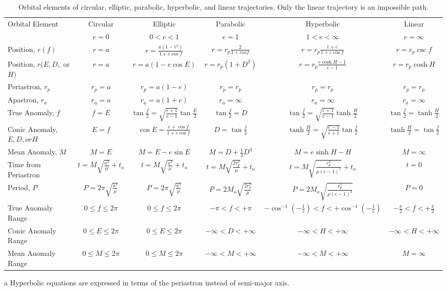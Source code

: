 \documentclass[a4paper,fleqn,usenatbib]{mnras}
\begin{document}
\begin{table}
\begin{threeparttable}
\centering
\caption{Orbital elements of circular, elliptic, parabolic, hyperbolic, and linear trajectories. Only the linear trajectory is an impossible path.}
\begin{tabular}{ l c c c c c }
 \hline
 \hline
Orbital Element & Circular & Elliptic & Parabolic &
 	Hyperbolic\tnote{a} & Linear \\
& $e=0$ & $0<e<1$ & $e=1$ & $1<e<\infty$ & $e=\infty$ \\
 \hline
 Position, $r(f)$ & $r=a$ & $r=\frac{a(1-e^2)}{1+e\cos{f}}$ & $r=r_p\frac{2}{1+cos{f}}$ & $r=r_p\frac{1+e}{1+e\cos{f}}$  & $r=r_p\csc{f}$ \\
 Position, $r(E, D,$ or $H)$ & $r=a$ & $r=a(1-e\cos{E})$ & $r=r_p(1+D^2)$ & $r=r_p\frac{e\cosh{H}-1}{e-1}$  & $r=r_p\cosh{H}$ \\
 Periastron, $r_p$ & $r_p=a$ & $r_p=a(1-e)$ & $r_p=r_p$ & $r_p=r_p$ & $r_p=r_p$ \\
 Apastron, $r_a$ & $r_a=a$ & $r_a=a(1+e)$ & $r_a=\infty$ & $r_a=\infty$ & $r_a=\infty$ \\
 True Anomaly, $f$ & $f=E$ & $\tan{\frac{f}{2}}=\sqrt{\frac{e+1}{e-1}}\tan{\frac{E}{2}}$ & $\tan{\frac{f}{2}}=D$ & $\tan{\frac{f}{2}}=\sqrt{\frac{e+1}{e-1}}\tanh{\frac{H}{2}}$ & $\tan{\frac{f}{2}}=\tanh{\frac{H}{2}}$ \\
 Conic Anomaly, $E, D, or H$ & $E=f$ & $\cos{E}=\frac{e+\cos{f}}{1+e\cos{f}}$ & $D=\tan{\frac{f}{2}}$ & $\tanh{\frac{H}{2}}=\sqrt{\frac{e-1}{e+1}}\tan{\frac{f}{2}}$ & $\tanh{\frac{H}{2}}=\tan{\frac{f}{2}}$ \\
 Mean Anomaly, $M$ & $M=E$ & $M=E-e\sin{E}$ & $M=D+\frac{1}{3}D^3$ & $M=e\sinh{H}-H$ & $M=\infty$ \\
 Time from Periastron & $t=M\sqrt{\frac{a^3}{\mu}} + t_o$ & $t=M\sqrt{\frac{a^3}{\mu}} + t_o$ & $t=M\sqrt{\frac{2r_p^3}{\mu}} + t_o$ & $t=M\sqrt{\frac{r_p^3}{\mu(e-1)^3}} + t_o$ & $t=0$ \\
 Period, $P$ & $P=2\pi\sqrt{\frac{a^3}{\mu}}$ & $P=2\pi\sqrt{\frac{a^3}{\mu}}$ & $P=2M_o\sqrt{\frac{2r_p^3}{\mu}}$ & $P=2M_o\sqrt{\frac{r_p^3}{\mu(e-1)^3}}$ & $P=0$ \\
 True Anomaly Range & $0\leq f \leq 2\pi$ & $0\leq f \leq 2\pi$ & $-\pi< f < +\pi$ & $-\cos^{-1}{(-\frac{1}{e})} < f < +\cos^{-1}{(-\frac{1}{e})}$ & $-\frac{\pi}{2} < f < +\frac{\pi}{2}$ \\
 Conic Anomaly Range & $0\leq E \leq 2\pi$ & $0\leq E \leq 2\pi$ & $-\infty < D < +\infty$ & $-\infty< H < +\infty$ & $-\infty< H < +\infty$ \\
 Mean Anomaly Range & $0\leq M \leq 2\pi$ & $0\leq M \leq 2\pi$ & $-\infty< M < +\infty$ & $-\infty < M < +\infty$ & $M=\infty$ \\
 \hline
 \hline
\end{tabular}
\label{tab:summary}
	\begin{tablenotes}
	\small
\item[a]{Hyperbolic equations are expressed in terms of the periastron instead of semi-major axis.}
	\end{tablenotes}
\end{threeparttable}
\end{table}
\end{document}

